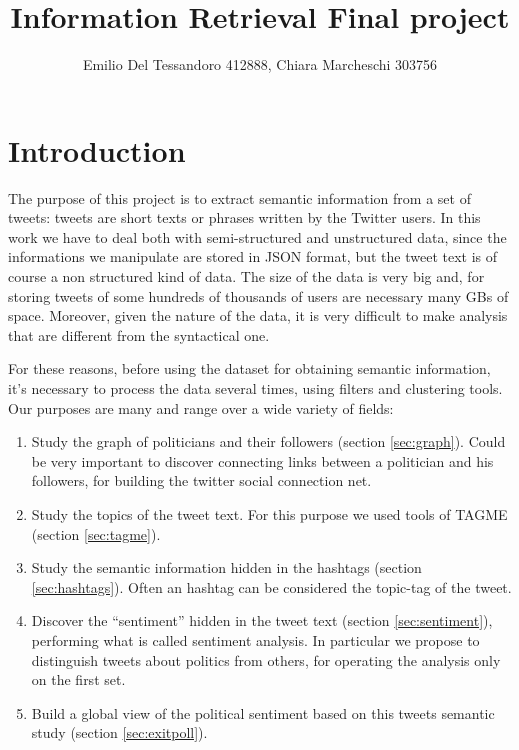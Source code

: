 \documentclass[a4paper,11pt,oneside]{article}
\title{\textbf{{\huge Information Retrieval Final project}}}
\author{Emilio Del Tessandoro 412888, Chiara Marcheschi 303756}
\begin{document}
\maketitle


\section{Introduction}
\label{sec:intro}
The purpose of this project is to extract semantic information from a set of tweets: tweets are short texts or phrases written by the Twitter users. In this work we have to deal both with semi-structured and unstructured data, since the informations we manipulate are stored in JSON format, but the tweet text is of course a non structured kind of data.
The size of the data is very big and, for storing tweets of some hundreds of thousands of users are necessary many GBs of space. Moreover, given the nature of the data, it is very difficult to make analysis that are different from the syntactical one.

For these reasons, before using the dataset for obtaining semantic information, it's necessary to process the data several times, using filters and clustering tools. Our purposes are many and range over a wide variety of fields:

\begin{enumerate}
 \item Study the graph of politicians and their followers (section \ref{sec:graph}). Could be very important to discover connecting links between a politician and his followers, for building the twitter social connection net.
 \item Study the topics of the tweet text. For this purpose we used tools of TAGME (section \ref{sec:tagme}).
 \item Study the semantic information hidden in the hashtags (section \ref{sec:hashtags}). Often an hashtag can be considered the topic-tag of the tweet.
 \item Discover the ``sentiment'' hidden in the tweet text (section \ref{sec:sentiment}), performing what is called sentiment analysis. In particular we propose to distinguish tweets about politics from others, for operating the analysis only on the first set.
 \item Build a global view of the political sentiment based on this tweets semantic study (section \ref{sec:exitpoll}).
\end{enumerate}
\end{document}
